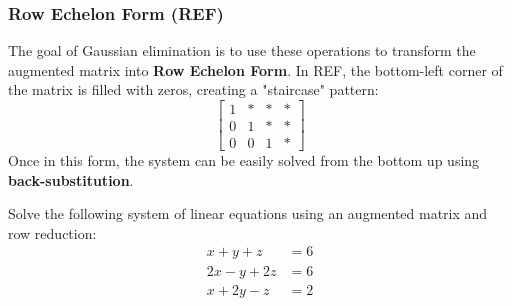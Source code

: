 \subsubsection*{Row Echelon Form (REF)}

The goal of Gaussian elimination is to use these operations to transform the augmented matrix into \textbf{Row Echelon Form}. In REF, the bottom-left corner of the matrix is filled with zeros, creating a "staircase" pattern:
\[
\left[ \begin{array}{ccc|c} 
1 & * & * & * \\ 
0 & 1 & * & * \\ 
0 & 0 & 1 & * 
\end{array} \right]
\]
Once in this form, the system can be easily solved from the bottom up using \textbf{back-substitution}.

\bigskip

\begin{problem}
Solve the following system of linear equations using an augmented matrix and row reduction:
\begin{align*}
x + y + z &= 6 \\
2x - y + 2z &= 6 \\
x + 2y - z &= 2
\end{align*}
\end{problem}

